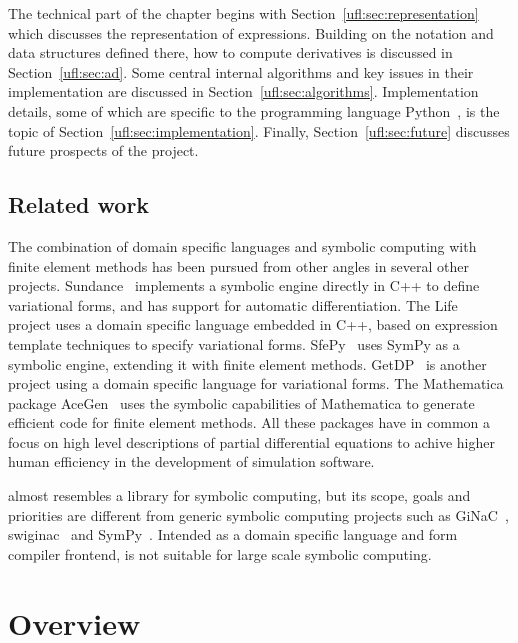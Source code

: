 The technical part of the chapter begins with
Section~\ref{ufl:sec:representation} which discusses the
representation of expressions.  Building on the notation and data
structures defined there, how to compute derivatives is discussed in
Section~\ref{ufl:sec:ad}.  Some central internal algorithms and key
issues in their implementation are discussed in
Section~\ref{ufl:sec:algorithms}.  Implementation details, some of
which are specific to the programming language
Python~\cite{Rossumothers}, is the topic of
Section~\ref{ufl:sec:implementation}.  Finally,
Section~\ref{ufl:sec:future} discusses future prospects of the \ufl{}
project.

\subsection{Related work} \label{ufl:sec:related}

The combination of domain specific languages and symbolic computing
with finite element methods has been pursued from other angles in
several other projects.  Sundance~\cite{Lon03,Lon04a,www:sundance}
implements a symbolic engine directly in C++ to define variational
forms, and has support for automatic differentiation.  The
Life~\cite{Pru2006a,Pru2006b} project uses a domain specific language
embedded in C++, based on expression template techniques to specify
variational forms.  SfePy~\cite{www:sfepy} uses SymPy as a symbolic
engine, extending it with finite element methods.
GetDP~\cite{DulGeu2005,www:getdp} is another project using a domain
specific language for variational forms.  The Mathematica package
AceGen~\cite{Kor1997,Kor2002} uses the symbolic capabilities of
Mathematica to generate efficient code for finite element methods.
All these packages have in common a focus on high level descriptions
of partial differential equations to achive higher human efficiency in
the development of simulation software.

\ufl{} almost resembles a library for symbolic computing,
but its scope, goals and priorities are different from generic
symbolic computing projects such as GiNaC~\cite{www:ginac,BauFri2000},
swiginac~\cite{www:swiginac} and SymPy~\cite{www:sympy}.  Intended as
a domain specific language and form compiler frontend,
\ufl{} is not suitable for large scale symbolic computing.

\section{Overview} \label{ufl:sec:overview}


